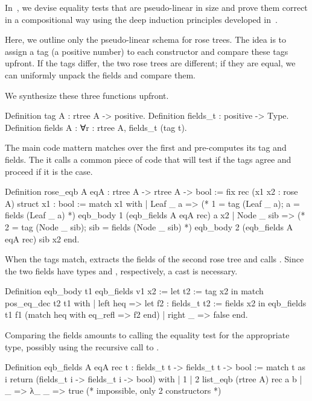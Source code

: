 \documentclass[a4paper, 11pt]{book}
\begin{document}
In~\cite{gregoire:hal-03800154}, we devise equality tests that are pseudo-linear
in size and prove them correct in a compositional way using the deep induction
principles developed in~\cite{tassi:hal-01897468}.

Here, we outline only the pseudo-linear schema for rose trees. The idea is to
assign a tag (a positive number) to each constructor and compare these tags
upfront. If the tags differ, the two rose trees are different; if they are
equal, we can uniformly unpack the fields and compare them.

We synthesize these three functions upfront.

\begin{rocqcode}
Definition tag A : rtree A -> positive.
Definition fields_t : positive -> Type.
Definition fields A :  ∀r : rtree A, fields_t (tag t).
\end{rocqcode}

The main code mattern matches over the first  and 
pre-computes its tag and fields. The it calls a common piece of
code  that will test if the tags agree and proceed
if it is the case.

\begin{rocqcode}
Definition rose_eqb A eqA : rtree A -> rtree A -> bool := 
  fix rec (x1 x2 : rose A) {struct x1} : bool :=
    match x1 with
    | Leaf _ a =>
        (* 1 = tag (Leaf _ a); a = fields (Leaf _ a) *)
        eqb_body 1 (eqb_fields A eqA rec) a x2
    | Node _ sib =>            
        (* 2 = tag (Node _ sib); sib = fields (Node _ sib) *)
        eqb_body 2 (eqb_fields A eqA rec) sib x2
    end.
\end{rocqcode}


When the tags match,  extracts the fields of the second rose
tree and calls . Since the two fields have types
 and , respectively, a cast is necessary.

\begin{rocqcode}
Definition eqb_body t1 eqb_fields v1 x2 :=
  let t2 := tag x2 in
  match pos_eq_dec t2 t1 with
  | left heq =>
    let f2 : fields_t t2 := fields x2 in
    eqb_fields t1 f1 (match heq with eq_refl => f2 end)
  | right _ => false
  end.
\end{rocqcode}

Comparing the fields amounts to calling the equality test for the appropriate
type, possibly using the recursive call to .

\begin{rocqcode}
Definition eqb_fields A eqA rec t :
  fields_t t -> fields_t t -> bool
:=
  match t as i return (fields_t i -> fields_t i -> bool) with
  | 1%
  | 2%
                    list_eqb (rtree A) rec a b
  | _ => λ_ _ => true (* impossible, only 2 constructors *)
\end{rocqcode}
\end{document}
